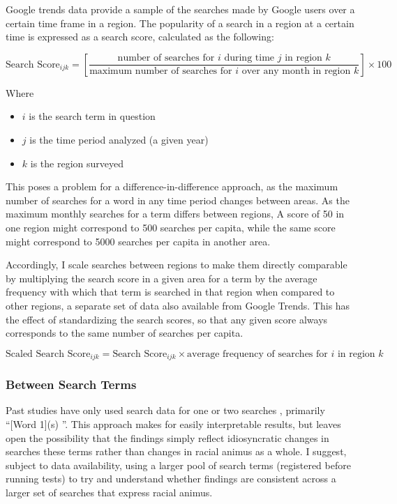 \documentclass{article}
\newcommand{\woneps}{[Word 1](s) }
\begin{document}
Google trends data provide a sample of the searches made by Google users over a certain time frame in a region.
The popularity of a search in a region at a certain time is expressed as a search score, calculated as the following:


\[
\text{Search Score}_{ijk} = [\frac{\text{number of searches for } i \text{ during time } j \text{ in region } k }{\text{maximum number of searches for } i \text{ over any month in region } k }] \times 100
\]

Where
\begin{itemize}
    \itemsep0em
    \item $i$ is the search term in question
    \item $j$ is the time period analyzed (a given year)
    \item $k$ is the region surveyed
\end{itemize}

This poses a problem for a difference-in-difference approach, as the maximum number of searches for a word in any time period changes between areas.
As the maximum monthly searches for a term differs between regions, A score of 50 in one region might correspond to 500 searches per capita, while the same score might correspond to 5000 searches per capita in another area.

Accordingly, I scale searches between regions to make them directly comparable by multiplying the search score in a given area for a term by the average frequency with which that term is searched in that region when compared to other regions, a separate set of data also available from Google Trends. This has the effect of standardizing the search scores, so that any given score always corresponds to the same number of searches per capita.

\[
    \text{Scaled Search Score}_{ijk} = \text{Search Score}_{ijk} \times \text{average frequency of searches for } i \text{ in region } k
\]

\subsubsection{Between Search Terms}
Past studies have only used search data for one or two searches \parencite[][26]{Stephens_Davidowitz_2014}, primarily ``\woneps''.
This approach makes for easily interpretable results, but leaves open the possibility that the findings simply reflect idiosyncratic changes in searches these terms rather than changes in racial animus as a whole.
I suggest, subject to data availability, using a larger pool of search terms (registered before running tests) to try and understand whether findings are consistent across a larger set of searches that express racial animus.
\end{document}
